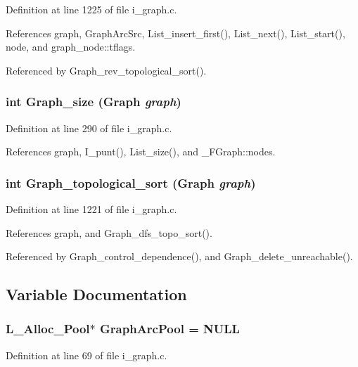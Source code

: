 Definition at line 1225 of file i\_\-graph.c.

References graph, Graph\-Arc\-Src, List\_\-insert\_\-first(), List\_\-next(), List\_\-start(), node, and graph\_\-node::tflags.

Referenced by Graph\_\-rev\_\-topological\_\-sort().
\subsubsection{\setlength{\rightskip}{0pt plus 5cm}int Graph\_\-size (\bf{Graph} {\em graph})}\label{i__graph_8c_a55d48bf0497adaa4d35c6eb40d0f756}




Definition at line 290 of file i\_\-graph.c.

References graph, I\_\-punt(), List\_\-size(), and \_\-FGraph::nodes.
\subsubsection{\setlength{\rightskip}{0pt plus 5cm}int Graph\_\-topological\_\-sort (\bf{Graph} {\em graph})}\label{i__graph_8c_d230ba246ef889997e1199eeb092da21}




Definition at line 1221 of file i\_\-graph.c.

References graph, and Graph\_\-dfs\_\-topo\_\-sort().

Referenced by Graph\_\-control\_\-dependence(), and Graph\_\-delete\_\-unreachable().

\subsection{Variable Documentation}
\subsubsection{\setlength{\rightskip}{0pt plus 5cm}\bf{L\_\-Alloc\_\-Pool}$\ast$ \bf{Graph\-Arc\-Pool} = NULL}\label{i__graph_8c_a02c4c93772cf46fa6707a1dca1d7445}




Definition at line 69 of file i\_\-graph.c.

